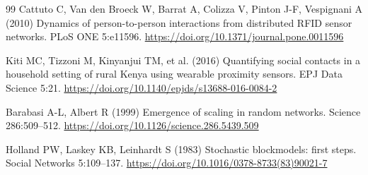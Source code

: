 \documentclass[smallextended]{svjour3}
\begin{document}
\begin{thebibliography}{99}
 Cattuto C, Van den Broeck W, Barrat A, Colizza V, Pinton J-F, Vespignani A (2010) Dynamics of person-to-person interactions from distributed RFID sensor networks. PLoS ONE 5:e11596. \url{https://doi.org/10.1371/journal.pone.0011596}

 Kiti MC, Tizzoni M, Kinyanjui TM, et al. (2016) Quantifying social contacts in a household setting of rural Kenya using wearable proximity sensors. EPJ Data Science 5:21. \url{https://doi.org/10.1140/epjds/s13688-016-0084-2}

 Barabasi A-L, Albert R (1999) Emergence of scaling in random networks. Science 286:509--512. \url{https://doi.org/10.1126/science.286.5439.509}

 Holland PW, Laskey KB, Leinhardt S (1983) Stochastic blockmodels: first steps. Social Networks 5:109--137. \url{https://doi.org/10.1016/0378-8733(83)90021-7}
\end{thebibliography}
\end{document}

